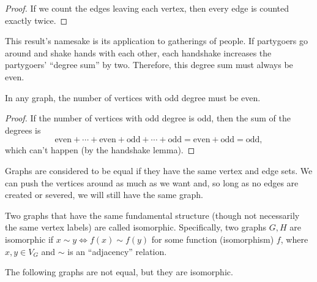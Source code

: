 \documentclass[../m55main.tex]{subfiles}
\begin{document}
\begin{proof}
    If we count the edges leaving each vertex, then every edge is counted exactly twice. 
\end{proof}

This result's namesake is its application to gatherings of people.
If partygoers go around and shake hands with each other, each handshake increases the partygoers' ``degree sum'' by two.
Therefore, this degree sum must always be even.

\begin{corollary}[Oddballs]
    In any graph, the number of vertices with odd degree must be even.
\end{corollary}

\begin{proof}
    If the number of vertices with odd degree is odd, then the sum of the degrees is
    \[ \text{even} + \cdots + \text{even} + \text{odd} + \cdots + \text{odd} = \text{even} + \text{odd} = \text{odd}, \]
    which can't happen (by the handshake lemma).
\end{proof}

Graphs are considered to be equal if they have the same vertex and edge sets.
We can push the vertices around as much as we want and, so long as no edges are created or severed, we will still have the same graph.

Two graphs that have the same fundamental structure (though not necessarily the same vertex labels) are called isomorphic.
Specifically, two graphs $G,H$ are isomorphic if $x \sim y \iff f(x) \sim f(y)$ for some function (isomorphism) $f$, where $x,y \in V_G$ and $\sim$ is an ``adjacency'' relation.

The following graphs are not equal, but they are isomorphic.

\medskip
\begin{center}
\end{center}
\end{document}
